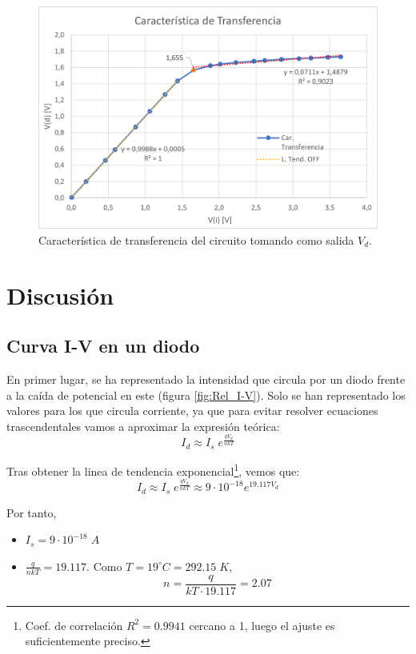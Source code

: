 \begin{figure}
    \centering
    \includegraphics[width=13cm]{Imágenes 04/Car_Trans.png}
    \caption{Característica de transferencia del circuito tomando como salida $V_d$.}
    \label{fig:Car_Trans}
\end{figure}




\section{Discusión}

\subsection{Curva I-V en un diodo}

En primer lugar, se ha representado la intensidad que circula por un diodo frente a la caída de potencial en este (figura \ref{fig:Rel_I-V}). Solo se han representado los valores para los que circula corriente, ya que para evitar resolver ecuaciones trascendentales vamos a aproximar la expresión teórica:
\begin{equation}
    I_d \approx I_s\;e^\frac{qV_d}{nkT}
\end{equation}

Tras obtener la linea de tendencia exponencial\footnote{Coef. de correlación $R^2 = 0.9941$ cercano a 1, luego el ajuste es suficientemente preciso.}, vemos que:
\begin{equation}
    I_d \approx I_s\;e^\frac{qV_d}{nkT} \approx 9\cdot 10^{-18} e^{19.117V_d}
\end{equation}

Por tanto,
\begin{itemize}
    \item $I_s = 9\cdot 10^{-18} \; A$
    \item $\frac{q}{nkT} = 19.117$. Como $T=19^\circ C = 292.15\;K$,
        $$
            n = \frac{q}{kT\cdot 19.117} = 2.07
        $$
\end{itemize}

